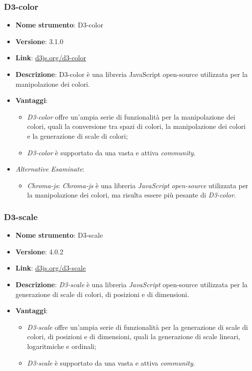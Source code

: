\subsubsection{D3-color}
\begin{itemize}
    \item \textbf{Nome strumento}: D3-color
    \item \textbf{Versione}: 3.1.0
    \item \textbf{Link}: \href{https://d3js.org/d3-color}{d3js.org/d3-color}
    \item \textbf{Descrizione}: D3-color è una libreria JavaScript open-source utilizzata per la manipolazione dei colori.
    \item \textbf{Vantaggi}:
          \begin{itemize}
              \item \textit{D3-color} offre un'ampia serie di funzionalità per la manipolazione dei colori, quali la conversione tra spazi di colori, la manipolazione dei colori
                    e la generazione di scale di colori;
              \item \textit{D3-color} è supportato da una vasta e attiva \textit{community}.
          \end{itemize}
    \item \textit{Alternative Esaminate}:
          \begin{itemize}
              \item \textit{Chroma-js}: \textit{Chroma-js} è una libreria \textit{JavaScript} \textit{open-source} utilizzata per la manipolazione dei colori, ma risulta essere più pesante di \textit{D3-color}.
          \end{itemize}
\end{itemize}

\subsubsection{D3-scale}
\begin{itemize}
    \item \textbf{Nome strumento}: D3-scale
    \item \textbf{Versione}: 4.0.2
    \item \textbf{Link}: \href{https://d3js.org/d3-scale}{d3js.org/d3-scale}
    \item \textbf{Descrizione}: \textit{D3-scale} è una libreria \textit{JavaScript} open-source utilizzata per la generazione di scale di colori, di posizioni e di dimensioni.
    \item \textbf{Vantaggi}:
          \begin{itemize}
              \item \textit{D3-scale} offre un'ampia serie di funzionalità per la generazione di scale di colori, di posizioni e di dimensioni, quali la generazione di scale lineari,
                    logaritmiche e ordinali;
              \item \textit{D3-scale} è supportato da una vasta e attiva \textit{community}.
          \end{itemize}
\end{itemize}

